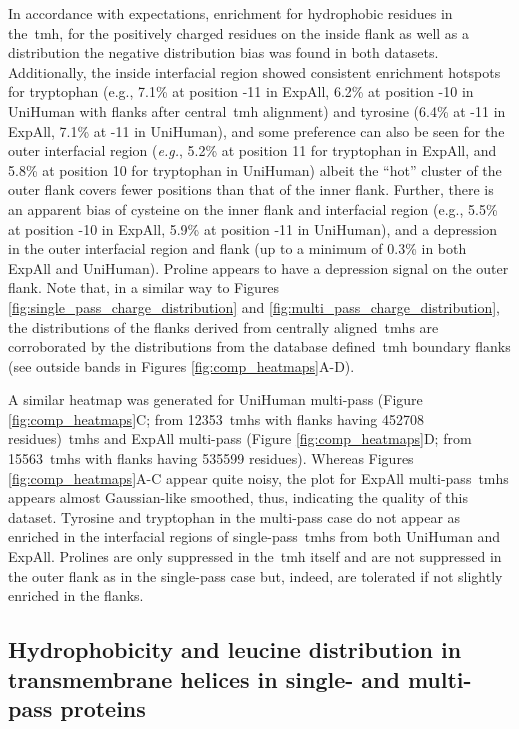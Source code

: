 In accordance with expectations, enrichment for hydrophobic residues in the~\gls{tmh}, for the positively charged residues on the inside flank as well as a distribution the negative distribution bias was found in both datasets.
Additionally, the inside interfacial region showed consistent enrichment hotspots for tryptophan (e.g., 7.1\% at position -11 in ExpAll, 6.2\% at position -10 in UniHuman with flanks after central~\gls{tmh} alignment) and tyrosine (6.4\% at -11 in ExpAll, 7.1\% at -11 in UniHuman), and some preference can also be seen for the outer interfacial region (\textit{e.g.}, 5.2\% at position 11 for tryptophan in ExpAll, and 5.8\% at position 10 for tryptophan in UniHuman) albeit the ``hot'' cluster of the outer flank covers fewer positions than that of the inner flank.
Further, there is an apparent bias of cysteine on the inner flank and interfacial region (e.g., 5.5\% at position -10 in ExpAll, 5.9\% at position -11 in UniHuman), and a depression in the outer interfacial region and flank (up to a minimum of 0.3\% in both ExpAll and UniHuman).
Proline appears to have a depression signal on the outer flank.
Note that, in a similar way to Figures \ref{fig:single_pass_charge_distribution} and \ref{fig:multi_pass_charge_distribution}, the distributions of the flanks derived from centrally aligned~\gls{tmh}s are corroborated by the distributions from the database defined~\gls{tmh} boundary flanks (see outside bands in Figures \ref{fig:comp_heatmaps}A-D).

A similar heatmap was generated for UniHuman multi-pass (Figure \ref{fig:comp_heatmaps}C; from 12353~\gls{tmh}s with flanks having 452708 residues)~\gls{tmh}s and ExpAll multi-pass (Figure \ref{fig:comp_heatmaps}D; from 15563~\gls{tmh}s with flanks having 535599 residues).
Whereas Figures \ref{fig:comp_heatmaps}A-C appear quite noisy, the plot for ExpAll multi-pass~\gls{tmh}s appears almost Gaussian-like smoothed, thus, indicating the quality of this dataset.
Tyrosine and tryptophan in the multi-pass case do not appear as enriched in the interfacial regions of single-pass~\gls{tmh}s from both UniHuman and ExpAll.
Prolines are only suppressed in the~\gls{tmh} itself and are not suppressed in the outer flank as in the single-pass case but, indeed, are tolerated if not slightly enriched in the flanks.

\subsection{Hydrophobicity and leucine distribution in transmembrane helices in single- and multi-pass proteins}

